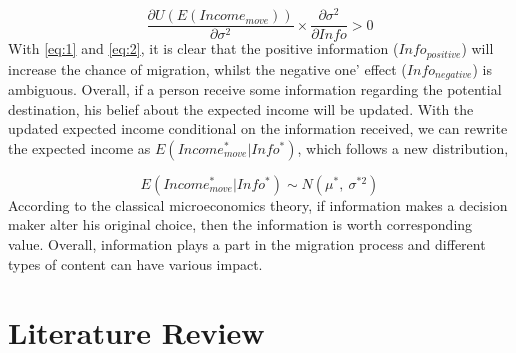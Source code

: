 \documentclass{article}
\begin{document}
 \begin{equation}\label{eq:2}
    \frac{\partial U(E(Income_{move}))}{\partial \sigma^2}\times\frac{\partial \sigma^2}{\partial Info} >0
 \end{equation}
 With \eqref{eq:1} and \eqref{eq:2}, it is clear that the positive information ($Info_{positive}$) will increase the chance of migration, whilst the negative one' effect ($Info_{negative}$) is ambiguous.
Overall, if a person receive some information regarding the potential destination, his belief about the expected income will be updated. With the updated expected income conditional on the information received, we can rewrite the expected income as $E(Income^*_{move}|Info^*)$, which follows a new distribution,

\begin{equation}
    E(Income^*_{move}|Info^*) \sim N(\mu^*,\ \sigma^{*2})
\end{equation}
According to the classical  microeconomics theory, if information makes a decision maker alter his original choice, then the information is worth corresponding value. Overall, information plays a part in the migration process and different types of content can have various impact.


\section{Literature Review}
\end{document}
